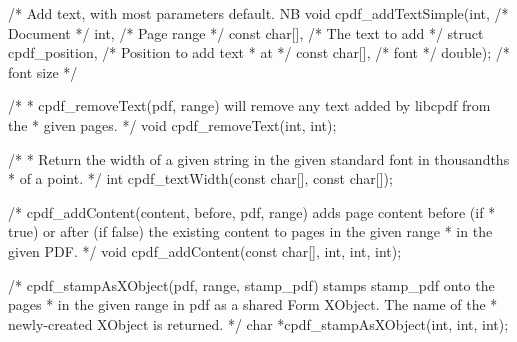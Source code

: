 /* Add text, with most parameters default. NB %
void cpdf_addTextSimple(int,                  /* Document */
                        int,                  /* Page range */
                        const char[],         /* The text to add */
                        struct cpdf_position, /* Position to add text
                                               * at */
                        const char[],         /* font */
                        double);              /* font size */

/*
 * cpdf_removeText(pdf, range) will remove any text added by libcpdf from the
 * given pages.
 */
void cpdf_removeText(int, int);

/*
 * Return the width of a given string in the given standard font in thousandths
 * of a point.
 */
int cpdf_textWidth(const char[], const char[]);

/* cpdf_addContent(content, before, pdf, range) adds page content before (if
 * true) or after (if false) the existing content to pages in the given range
 * in the given PDF. */
void cpdf_addContent(const char[], int, int, int);

/* cpdf_stampAsXObject(pdf, range, stamp_pdf) stamps stamp_pdf onto the pages
 * in the given range in pdf as a shared Form XObject. The name of the
 * newly-created XObject is returned. */
char *cpdf_stampAsXObject(int, int, int);


